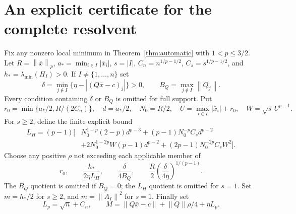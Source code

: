 \documentclass[11pt]{article}
\newcommand{\norm}[1]{\left\lVert#1\right\rVert}
\theoremstyle{remark}\newtheorem{remark}[theorem]{Remark}
\begin{document}
\section{An explicit certificate for the complete resolvent}
Fix any nonzero local minimum in Theorem~\ref{thm:automatic} with
$1<p\le3/2$. Let $R=\norm{\bar x}_p$, $a_*=\min_{i\in I}|\bar x_i|$,
$s=|I|$, $C_n=n^{1/p-1/2}$, $C_s=s^{1/p-1/2}$, and
$h_* =\lambda_{\min}(H_I)>0$. If $I\ne\{1,\ldots,n\}$ set
\[
 \delta=\min_{j\notin I}\{\eta-|(Q\bar x-c)_j|\}>0,
 \qquad B_Q=\max_{j\notin I}\norm{Q_j}.
\]
Every condition containing $\delta$ or $B_Q$ is omitted for full support.
Put
\[
 r_0=\min\{a_*/2,R/(2C_n)\},\quad d=a_*/2,\quad N_0=R/2,
 \quad U=\max_{i\in I}|\bar x_i|+r_0,\quad W=\sqrt{s}\,U^{p-1}.
\]
For $s\ge2$, define the finite explicit bound
\begin{align}\label{eq:LH}
 L_H=(p-1)\big[&N_0^{1-p}(2-p)d^{p-3}
 +(p-1)N_0^{-p}C_s d^{p-2}\nonumber\\
 &+2N_0^{1-2p}W(p-1)d^{p-2}
 +(2p-1)N_0^{-2p}C_s W^2\big].
\end{align}
Choose any positive $\rho$ not exceeding each applicable member of
\begin{equation}\label{eq:rho}
 r_0,\qquad \frac{h_*}{2\eta L_H},\qquad
 \frac{\delta}{4B_Q},\qquad
 \frac R2\left(\frac{\delta}{4\eta}\right)^{1/(p-1)}.
\end{equation}
The $B_Q$ quotient is omitted if $B_Q=0$; the $L_H$ quotient is omitted
for $s=1$. Set $m=h_*/2$ for $s\ge2$, and
$m=\norm{A_I}^2$ for $s=1$. Finally set
\begin{equation}\label{eq:M}
 L_p=\sqrt n+C_n,\qquad
 M=\norm{Q\bar x-c}+\norm Q\rho/4+\eta L_p.
\end{equation}
\end{document}
